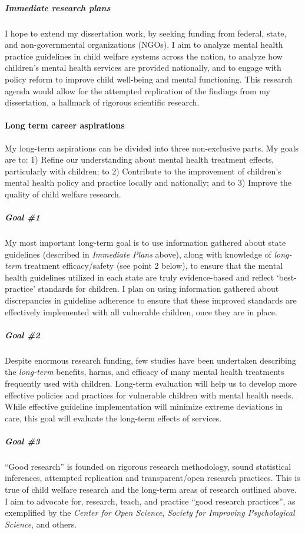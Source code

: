 \documentclass[twocolumn, issue, rga, authordate]{jote-new-article}
\begin{document}
\subparagraph{Immediate research plans} I hope to extend my dissertation
work, by seeking funding from federal, state, and non-governmental
organizations (NGOs). I aim to analyze mental health practice guidelines
in child welfare systems across the nation, to analyze how children's
mental health services are provided nationally, and to engage with
policy reform to improve child well-being and mental functioning. This
research agenda would allow for the attempted replication of the
findings from my dissertation, a hallmark of rigorous scientific
research.


\paragraph{Long term career aspirations}


My long-term aspirations can be divided into three non-exclusive parts.
My goals are to: 1) Refine our understanding about mental health
treatment effects, particularly with children; to 2) Contribute to the
improvement of children's mental health policy and practice locally and
nationally; and to 3) Improve the quality of child welfare research.

\subparagraph{Goal \#1} My most important long-term goal is to use
information gathered about state guidelines (described in
\emph{Immediate Plans} above), along with knowledge of \emph{long-term}
treatment efficacy/safety (see point 2 below), to ensure that the mental
health guidelines utilized in each state are truly evidence-based and
reflect `best-practice' standards for children. I plan on using
information gathered about discrepancies in guideline adherence to
ensure that these improved standards are effectively implemented with
all vulnerable children, once they are in place.

\subparagraph{Goal \#2} Despite enormous research funding, few studies have
been undertaken describing the \emph{long-term} benefits, harms, and
efficacy of many mental health treatments frequently used with children.
Long-term evaluation will help us to develop more effective policies and
practices for vulnerable children with mental health needs. While
effective guideline implementation will minimize extreme deviations in
care, this goal will evaluate the long-term effects of services.

\subparagraph{Goal \#3} ``Good research'' is founded on rigorous research
methodology, sound statistical inferences, attempted replication and
transparent/open research practices. This is true of child welfare
research and the long-term areas of research outlined above. I aim to
advocate for, research, teach, and practice ``good research practices'',
as exemplified by the \emph{Center for Open Science}, \emph{Society for
Improving Psychological Science}, and others.
\end{document}
